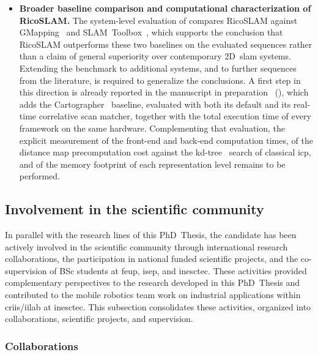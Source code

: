 \begin{itemize}
natural starting points for this development;
\item \textbf{Broader baseline comparison and computational
characterization of RicoSLAM.}
The system-level evaluation of  compares RicoSLAM against
GMapping~\cite{grisetti:tro:2007} and
SLAM~Toolbox~\cite{macenski-jambrecic:joss:2021}, which supports the
conclusion that RicoSLAM outperforms these two baselines on the evaluated
sequences rather than a claim of general superiority over contemporary
2D~\gls{slam} systems. Extending the benchmark to additional systems, and to
further sequences from the literature, is required to generalize the
conclusions. A first step in this direction is already reported in the
manuscript in preparation~\cite{sousa:ral:2026} (),
which adds the Cartographer~\cite{hess:icra:2016} baseline, evaluated with
both its default and its real-time correlative scan matcher, together with
the total execution time of every framework on the same hardware.
Complementing that evaluation, the explicit measurement of the front-end and
back-end computation times, of the distance map precomputation cost against
the kd-tree~\cite{bentley:cacm:1975} search of classical \gls{icp}, and of
the memory footprint of each representation level remains to be performed.
\end{itemize}

\subsection{Involvement in the scientific community}\label{sec:conclusions:community}

In parallel with the research lines of this PhD~Thesis,
the candidate has been actively involved in the scientific
community through international research collaborations, the participation in
national funded scientific projects, and the co-supervision of BSc students at
\gls{feup}, \gls{isep}, and \gls{inesctec}. These activities provided
complementary perspectives to the research developed in this
PhD~Thesis and contributed to the mobile robotics team work on industrial
applications within \gls{criis}/\gls{iilab} at \gls{inesctec}.
This subsection consolidates these activities, organized into collaborations,
scientific projects, and supervision.

\subsubsection{Collaborations}

